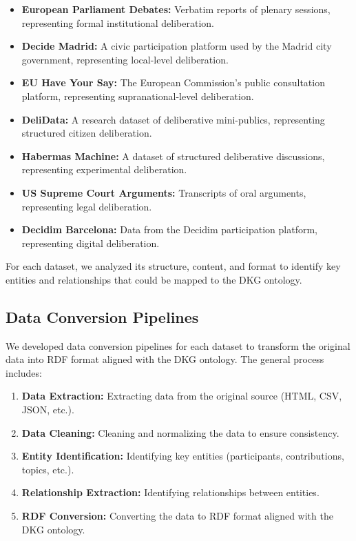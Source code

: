 \documentclass[runningheads]{llncs}  %
\begin{document}
\begin{itemize}
    \item \textbf{European Parliament Debates:} Verbatim reports of plenary sessions, representing formal institutional deliberation.
    \item \textbf{Decide Madrid:} A civic participation platform used by the Madrid city government, representing local-level deliberation.
    \item \textbf{EU Have Your Say:} The European Commission's public consultation platform, representing supranational-level deliberation.
    \item \textbf{DeliData:} A research dataset of deliberative mini-publics, representing structured citizen deliberation.
    \item \textbf{Habermas Machine:} A dataset of structured deliberative discussions, representing experimental deliberation.
    \item \textbf{US Supreme Court Arguments:} Transcripts of oral arguments, representing legal deliberation.
    \item \textbf{Decidim Barcelona:} Data from the Decidim participation platform, representing digital deliberation.
\end{itemize}

For each dataset, we analyzed its structure, content, and format to identify key entities and relationships that could be mapped to the DKG ontology.

\subsection{Data Conversion Pipelines}
We developed data conversion pipelines for each dataset to transform the original data into RDF format aligned with the DKG ontology. The general process includes:

\begin{enumerate}
    \item \textbf{Data Extraction:} Extracting data from the original source (HTML, CSV, JSON, etc.).
    \item \textbf{Data Cleaning:} Cleaning and normalizing the data to ensure consistency.
    \item \textbf{Entity Identification:} Identifying key entities (participants, contributions, topics, etc.).
    \item \textbf{Relationship Extraction:} Identifying relationships between entities.
    \item \textbf{RDF Conversion:} Converting the data to RDF format aligned with the DKG ontology.
\end{enumerate}
\end{document}
